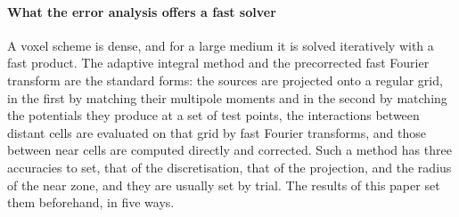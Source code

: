\documentclass[preprint,review,12pt]{elsarticle}
\begin{document}
\paragraph{What the error analysis offers a fast solver} A voxel scheme is dense, and for a large
medium it is solved iteratively with a fast product. The adaptive integral method
\citep{Bleszynski1996} and the precorrected fast Fourier transform \citep{Phillips1997} are the
standard forms: the sources are projected onto a regular grid, in the first by matching their multipole
moments and in the second by matching the potentials they produce at a set of test points, the
interactions between distant cells are evaluated on that grid by fast Fourier transforms, and those
between near cells are computed directly and corrected. Such a method has three accuracies to set, that
of the discretisation, that of the projection, and the radius of the near zone, and they are usually
set by trial. The results of this paper set them beforehand, in five ways.
\end{document}
